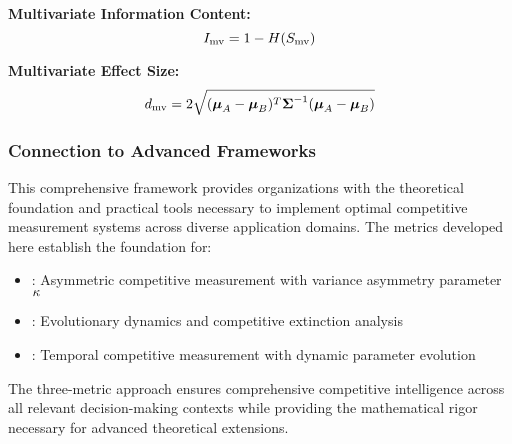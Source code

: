 \textbf{Multivariate Information Content:}
\begin{equation}
I_{\text{mv}} = 1 - H(S_{\text{mv}})
\end{equation}

\textbf{Multivariate Effect Size:}
\begin{equation}
d_{\text{mv}} = 2\sqrt{(\boldsymbol{\mu}_A - \boldsymbol{\mu}_B)^T \boldsymbol{\Sigma}^{-1} (\boldsymbol{\mu}_A - \boldsymbol{\mu}_B)}
\end{equation}

\subsubsection{Connection to Advanced Frameworks}

This comprehensive framework provides organizations with the theoretical foundation and practical tools necessary to implement optimal competitive measurement systems across diverse application domains. The metrics developed here establish the foundation for:

\begin{itemize}
\item \textbf{\papertwo}: Asymmetric competitive measurement with variance asymmetry parameter $\kappa$
\item \textbf{\paperthree}: Evolutionary dynamics and competitive extinction analysis
\item \textbf{\paperfour}: Temporal competitive measurement with dynamic parameter evolution
\end{itemize}

The three-metric approach ensures comprehensive competitive intelligence across all relevant decision-making contexts while providing the mathematical rigor necessary for advanced theoretical extensions.
